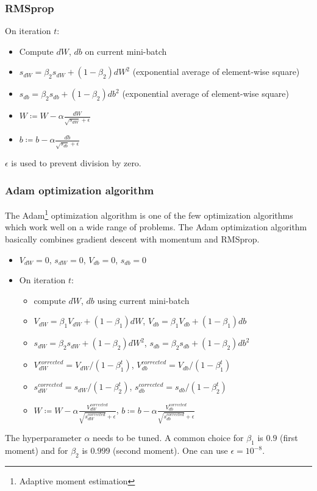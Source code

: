 \documentclass{article}
\begin{document}
\subsubsection{RMSprop}
On iteration $t$:
\begin{itemize}
  \item Compute $dW$, $db$ on current mini-batch
  \item $s_{dW}=\beta_2 s_{dW}+(1-\beta_2)dW^2$ (exponential average of element-wise square)
  \item $s_{db}=\beta_2 s_{db}+(1-\beta_2)db^2$ (exponential average of element-wise square)
  \item $W\coloneqq W-\alpha\frac{dW}{\sqrt{s_{dW}}+\epsilon}$
  \item $b\coloneqq b-\alpha\frac{db}{\sqrt{s_{db}}+\epsilon}$
\end{itemize}
$\epsilon$ is used to prevent division by zero.

\subsubsection{Adam optimization algorithm}
The Adam\footnote{Adaptive moment estimation} optimization algorithm is one of the few optimization algorithms
which work well on a wide range of problems.
The Adam optimization algorithm basically combines gradient descent with momentum and RMSprop. 
\begin{itemize}
  \item $V_{dW}=0$, $s_{dW}=0$, $V_{db}=0$, $s_{db}=0$
  \item On iteration $t$:
    \begin{itemize}
      \item compute $dW$, $db$ using current mini-batch
      \item $V_{dW}=\beta_1 V_{dW}+(1-\beta_1)dW$, $V_{db}=\beta_1 V_{db}+(1-\beta_1)db$
      \item $s_{dW}=\beta_2 s_{dW}+(1-\beta_2)dW^2$, $s_{db}=\beta_2 s_{db}+(1-\beta_2)db^2$
      \item $V_{dW}^{corrected}=V_{dW}/(1-\beta_1^t)$, $V_{db}^{corrected}=V_{db}/(1-\beta_1^t)$
      \item $s_{dW}^{corrected}=s_{dW}/(1-\beta_2^t)$, $s_{db}^{corrected}=s_{db}/(1-\beta_2^t)$
      \item $W\coloneqq W-\alpha\frac{V_{dW}^{corrected}}{\sqrt{s_{dW}^{corrected}}+\epsilon}$,
        $b\coloneqq b-\alpha\frac{V_{db}^{corrected}}{\sqrt{s_{db}^{corrected}}+\epsilon}$
    \end{itemize}
\end{itemize}
The hyperparameter $\alpha$ needs to be tuned.
A common choice for $\beta_1$ is $0.9$ (first moment) and for $\beta_2$ is $0.999$ (second moment).
One can use $\epsilon=10^{-8}$.
\end{document}
